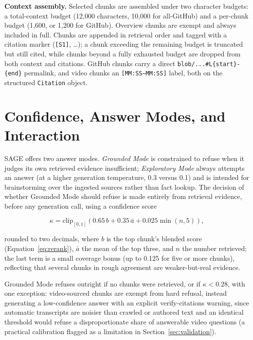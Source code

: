 \documentclass[conference]{IEEEtran}
\begin{document}
\textbf{Context assembly.} Selected chunks are assembled under two character budgets: a total-context budget (12{,}000 characters, 10{,}000 for all-GitHub) and a per-chunk budget (1{,}600, or 1{,}200 for GitHub). Overview chunks are exempt and always included in full. Chunks are appended in retrieval order and tagged with a citation marker (\texttt{[S1]}, \ldots); a chunk exceeding the remaining budget is truncated but still cited, while chunks beyond a fully exhausted budget are dropped from both context and citations. GitHub chunks carry a direct \texttt{blob/...\#L\{start\}-\{end\}} permalink, and video chunks an \texttt{[MM:SS--MM:SS]} label, both on the structured \texttt{Citation} object.

\section{Confidence, Answer Modes, and Interaction}
\label{sec:confidence}

SAGE offers two answer modes. \emph{Grounded Mode} is constrained to refuse when it judges its own retrieved evidence insufficient; \emph{Exploratory Mode} always attempts an answer (at a higher generation temperature, 0.3 versus 0.1) and is intended for brainstorming over the ingested sources rather than fact lookup. The decision of whether Grounded Mode should refuse is made entirely from retrieval evidence, before any generation call, using a confidence score

\begin{equation}
\kappa = \mathrm{clip}_{[0,1]}\!\left(0.65\, b + 0.35\, \bar{a} + 0.025 \min(n, 5)\right),
\label{eq:confidence}
\end{equation}

rounded to two decimals, where $b$ is the top chunk's blended score (Equation~\ref{eq:rerank}), $\bar{a}$ the mean of the top three, and $n$ the number retrieved; the last term is a small coverage bonus (up to 0.125 for five or more chunks), reflecting that several chunks in rough agreement are weaker-but-real evidence.

Grounded Mode refuses outright if no chunks were retrieved, or if $\kappa < 0.28$, with one exception: video-sourced chunks are exempt from hard refusal, instead generating a low-confidence answer with an explicit verify-citations warning, since automatic transcripts are noisier than crawled or authored text and an identical threshold would refuse a disproportionate share of answerable video questions (a practical calibration flagged as a limitation in Section~\ref{sec:validation}).
\end{document}
